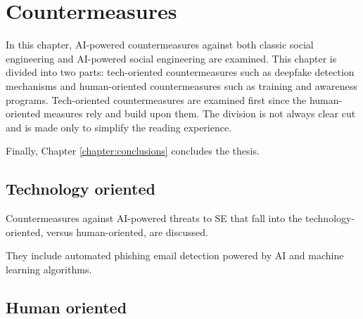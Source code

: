 



\chapter{Countermeasures\label{chapter:countermeasures}}
\begin{comment}


\end{comment}

In this chapter, AI-powered countermeasures against both classic social engineering and AI-powered social engineering are examined. This chapter is divided into two parts: tech-oriented countermeasures such as deepfake detection mechanisms and human-oriented countermeasures such as training and awareness programs. Tech-oriented countermeasures are examined first since the human-oriented measures rely and build upon them. The division is not always clear cut and is made only to simplify the reading experience.

Finally, Chapter \ref{chapter:conclusions} concludes the thesis.


\section{Technology oriented}
\begin{comment}
    
    - 

\end{comment}

Countermeasures against AI-powered threats to SE that fall into the technology-oriented, versus human-oriented, are discussed.

They include automated phishing email detection powered by AI and machine learning algorithms.




\section{Human oriented}
\begin{comment}
    
    - The best defense against SE attacks is an educated, conscious user
    - User education should be continuous and not a one-off event

\end{comment}

